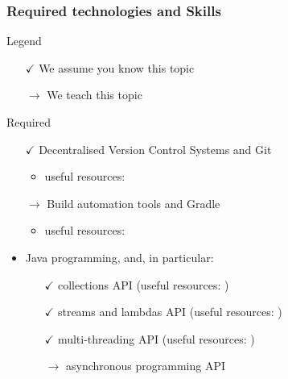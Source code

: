 \documentclass[handout]{beamer}\mode<presentation>{\usetheme{AMSCesenaPurpleAndGold}}
\begin{document}
\begin{frame}[allowframebreaks]
	\frametitle{Required technologies and Skills}

	\begin{block}{Legend}
		\begin{multicols}{2}
			\begin{itemize}
				\item[$\checkmark$] We assume you know this topic
				\item[$\rightarrow$] We teach this topic
			\end{itemize}
		\end{multicols}
	\end{block}

	\begin{alertblock}{Required}
		\begin{itemize}
			\item[$\checkmark$] Decentralised Version Control Systems and \alert{Git}
			\begin{itemize}
				\item useful resources: 
			\end{itemize}

			\vfill

			\item[$\rightarrow$] Build automation tools and \alert{Gradle}
			\begin{itemize}
				\item useful resources: 
			\end{itemize}

			\vfill

			\item Java programming, and, in particular:
			\begin{itemize}
				\item[$\checkmark$] collections API (useful resources: )
				\item[$\checkmark$] streams and lambdas API (useful resources: )
				\item[$\checkmark$] multi-threading API (useful resources: )
				\item[$\rightarrow$] asynchronous programming API
			\end{itemize}

		\end{itemize}
	\end{alertblock}


\end{frame}
\end{document}
